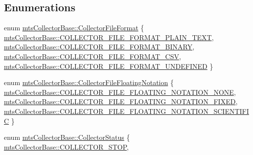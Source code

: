 \subsection*{Enumerations}
\begin{DoxyCompactItemize}
\item 
enum \hyperlink{group__cisst_multi_task_gaa228bed8144053d0bfa316f9ac9d0901}{mts\+Collector\+Base\+::\+Collector\+File\+Format} \{ \hyperlink{group__cisst_multi_task_ggaa228bed8144053d0bfa316f9ac9d0901abbf072308b212f1331b566519d0c178d}{mts\+Collector\+Base\+::\+C\+O\+L\+L\+E\+C\+T\+O\+R\+\_\+\+F\+I\+L\+E\+\_\+\+F\+O\+R\+M\+A\+T\+\_\+\+P\+L\+A\+I\+N\+\_\+\+T\+E\+X\+T}, 
\hyperlink{group__cisst_multi_task_ggaa228bed8144053d0bfa316f9ac9d0901ab8cbb54e933107857df1a7745a95bf05}{mts\+Collector\+Base\+::\+C\+O\+L\+L\+E\+C\+T\+O\+R\+\_\+\+F\+I\+L\+E\+\_\+\+F\+O\+R\+M\+A\+T\+\_\+\+B\+I\+N\+A\+R\+Y}, 
\hyperlink{group__cisst_multi_task_ggaa228bed8144053d0bfa316f9ac9d0901a4ee4b02e555603aafc22593f28cc7841}{mts\+Collector\+Base\+::\+C\+O\+L\+L\+E\+C\+T\+O\+R\+\_\+\+F\+I\+L\+E\+\_\+\+F\+O\+R\+M\+A\+T\+\_\+\+C\+S\+V}, 
\hyperlink{group__cisst_multi_task_ggaa228bed8144053d0bfa316f9ac9d0901ae29b8a9aa7f007f9b5ef48824c0d34c5}{mts\+Collector\+Base\+::\+C\+O\+L\+L\+E\+C\+T\+O\+R\+\_\+\+F\+I\+L\+E\+\_\+\+F\+O\+R\+M\+A\+T\+\_\+\+U\+N\+D\+E\+F\+I\+N\+E\+D}
 \}
\item 
enum \hyperlink{group__cisst_multi_task_gad5d486fde9f8105e4de551d00026ea93}{mts\+Collector\+Base\+::\+Collector\+File\+Floating\+Notation} \{ \hyperlink{group__cisst_multi_task_ggad5d486fde9f8105e4de551d00026ea93ad16b37e54a197f2279fa9bbb6671d05a}{mts\+Collector\+Base\+::\+C\+O\+L\+L\+E\+C\+T\+O\+R\+\_\+\+F\+I\+L\+E\+\_\+\+F\+L\+O\+A\+T\+I\+N\+G\+\_\+\+N\+O\+T\+A\+T\+I\+O\+N\+\_\+\+N\+O\+N\+E}, 
\hyperlink{group__cisst_multi_task_ggad5d486fde9f8105e4de551d00026ea93a6a7b1140c5dcef2cbd16ba1198df1f6b}{mts\+Collector\+Base\+::\+C\+O\+L\+L\+E\+C\+T\+O\+R\+\_\+\+F\+I\+L\+E\+\_\+\+F\+L\+O\+A\+T\+I\+N\+G\+\_\+\+N\+O\+T\+A\+T\+I\+O\+N\+\_\+\+F\+I\+X\+E\+D}, 
\hyperlink{group__cisst_multi_task_ggad5d486fde9f8105e4de551d00026ea93a9aa1dc07dd5f31c35bffc8c03c32e2c8}{mts\+Collector\+Base\+::\+C\+O\+L\+L\+E\+C\+T\+O\+R\+\_\+\+F\+I\+L\+E\+\_\+\+F\+L\+O\+A\+T\+I\+N\+G\+\_\+\+N\+O\+T\+A\+T\+I\+O\+N\+\_\+\+S\+C\+I\+E\+N\+T\+I\+F\+I\+C}
 \}
\item 
enum \hyperlink{group__cisst_multi_task_gadfbc058665584a56933a7997229c1fb6}{mts\+Collector\+Base\+::\+Collector\+Status} \{ \hyperlink{group__cisst_multi_task_ggadfbc058665584a56933a7997229c1fb6a2bf9d2e7c0bcf5aa734411dd6c969ff2}{mts\+Collector\+Base\+::\+C\+O\+L\+L\+E\+C\+T\+O\+R\+\_\+\+S\+T\+O\+P}, 

\end{DoxyCompactItemize}
